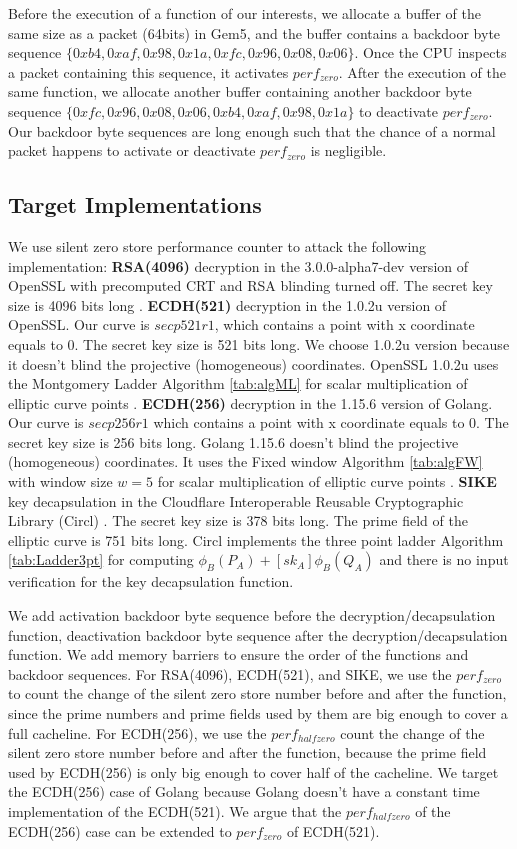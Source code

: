 \documentclass{iacrtrans}
\begin{document}
Before the execution of a function of our interests, we allocate a buffer of the same size as a packet (64bits) in Gem5, and the buffer contains a backdoor byte sequence $\{0xb4,0xaf,0x98,0x1a,0xfc,0x96,0x08,0x06\}$. Once the CPU inspects a packet containing this sequence, it activates $perf_{zero}$. After the execution of the same function, we allocate another buffer containing another backdoor byte sequence $\{0xfc,0x96,0x08,0x06,0xb4,0xaf,0x98,0x1a\}$ to deactivate $perf_{zero}$. Our backdoor byte sequences are long enough such that the chance of a normal packet happens to activate or deactivate $perf_{zero}$ is negligible. 


\subsection{Target Implementations}
We use silent zero store performance counter to attack the following implementation: \textbf{RSA(4096)} decryption in the 3.0.0-alpha7-dev version of OpenSSL with precomputed CRT and RSA blinding turned off. The secret key size is 4096 bits long \cite{openssl}. \textbf{ECDH(521)} decryption in the 1.0.2u version of OpenSSL. Our curve is $secp521r1$, which contains a point with x coordinate equals to 0. The secret key size is 521 bits long. We choose 1.0.2u version because it doesn't blind the projective (homogeneous) coordinates. OpenSSL 1.0.2u uses the Montgomery Ladder Algorithm \ref{tab:algML} for scalar multiplication of elliptic curve points \cite{openssl}. \textbf{ECDH(256)} decryption in the 1.15.6 version of Golang. Our curve is $secp256r1$ which contains a point with x coordinate equals to 0. The secret key size is 256 bits long. Golang 1.15.6 doesn't blind the projective (homogeneous) coordinates. It uses the Fixed window Algorithm \ref{tab:algFW} with window size $w=5$ for scalar multiplication of elliptic curve points \cite{donovan2015go}. \textbf{SIKE} key decapsulation in the Cloudflare Interoperable Reusable Cryptographic Library (Circl) \cite{circl}. The secret key size is 378 bits long. The prime field of the elliptic curve is 751 bits long. Circl implements the three point ladder Algorithm \ref{tab:Ladder3pt} for computing $\phi_B(P_A) + [sk_A]\phi_B(Q_A)$ and there is no input verification for the key decapsulation function. 

We add activation backdoor byte sequence before the decryption/decapsulation function, deactivation backdoor byte sequence after the decryption/decapsulation function. We add memory barriers to ensure the order of the functions and backdoor sequences. For RSA(4096), ECDH(521), and SIKE, we use the $perf_{zero}$ to count the change of the silent zero store number before and after the function, since the prime numbers and prime fields used by them are big enough to cover a full cacheline. For ECDH(256), we use the $perf_{halfzero}$ count the change of the silent zero store number before and after the function, because the prime field used by ECDH(256) is only big enough to cover half of the cacheline. We target the ECDH(256) case of Golang because Golang doesn't have a constant time implementation of the ECDH(521). We argue that the $perf_{halfzero}$ of the ECDH(256) case can be extended to $perf_{zero}$ of ECDH(521). 
\end{document}
